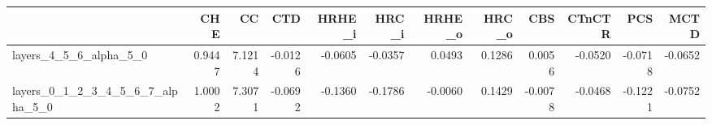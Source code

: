 \begin{tabular}{lrrrrrrrrrrr}
\toprule
 & CHE & CC & CTD & HRHE_i & HRC_i & HRHE_o & HRC_o & CBS & CTnCTR & PCS & MCTD \\
\midrule
layers_4_5_6_alpha_5_0 & 0.9447 & 7.1214 & -0.0126 & -0.0605 & -0.0357 & 0.0493 & 0.1286 & 0.0056 & -0.0520 & -0.0718 & -0.0652 \\
layers_0_1_2_3_4_5_6_7_alpha_5_0 & 1.0002 & 7.3071 & -0.0692 & -0.1360 & -0.1786 & -0.0060 & 0.1429 & -0.0078 & -0.0468 & -0.1221 & -0.0752 \\
\bottomrule
\end{tabular}

